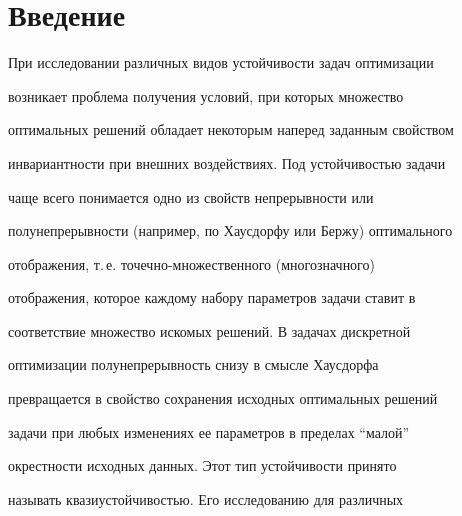 \date{}




\pagestyle{plain} %







\maketitle


\label{begin}











\section{Введение}





При исследовании различных видов устойчивости задач оптимизации


возникает проблема получения условий, при которых множество


оптимальных решений обладает некоторым наперед заданным свойством


инвариантности при внешних воздействиях. Под устойчивостью задачи


чаще всего понимается одно из свойств непрерывности или


полунепрерывности (например, по Хаусдорфу или Бержу) оптимального


отображения, т.\,е. точечно-множественного (многозначного)


отображения, которое каждому набору параметров задачи ставит в


соответствие множество искомых решений. В задачах дискретной


оптимизации полунепрерывность снизу в смысле Хаусдорфа


превращается в свойство сохранения исходных оптимальных решений


задачи при любых изменениях ее параметров в пределах ``малой''


окрестности исходных данных. Этот тип устойчивости принято


называть квазиустойчивостью. Его исследованию для различных


